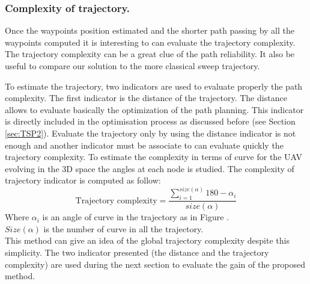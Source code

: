  
\subsubsection*{Complexity of trajectory. }\label{tarjectory}

Once the waypoints position estimated and the shorter path passing by all the waypoints computed it is interesting to can evaluate the trajectory complexity. The trajectory complexity can be a great clue of the path reliability.  It also be useful to compare our solution to the more classical sweep trajectory.
 
To estimate the trajectory, two indicators are used to evaluate properly the path complexity. The first indicator is the distance of the trajectory. The distance allows to evaluate basically the optimization of the path planning. This indicator is directly included in the optimisation process as discussed before (see Section \ref{sec:TSP2}). 
Evaluate the trajectory only by using the distance indicator is not enough and another indicator must be associate to can evaluate quickly the trajectory complexity. To estimate the complexity in terms of curve for the UAV evolving in the 3D space the angles at each node is studied. 
The complexity of trajectory indicator is computed as follow: 
\begin{equation}\label{Eq:trajectory}
\mbox{Trajectory complexity}=\frac{ \sum_{i=1}^{size(\alpha)} 180- \alpha_{i}  }{size(\alpha)}   
\end{equation}
Where $\alpha_i$ is an angle of curve in the trajectory as in Figure . \\
$Size(\alpha)$ is the number of curve in all the trajectory.\\ 
This method can give an idea of the global trajectory complexity despite this simplicity. 
The two indicator presented (the distance and the trajectory complexity) are used during the next section to evaluate the gain of the proposed method.
	
